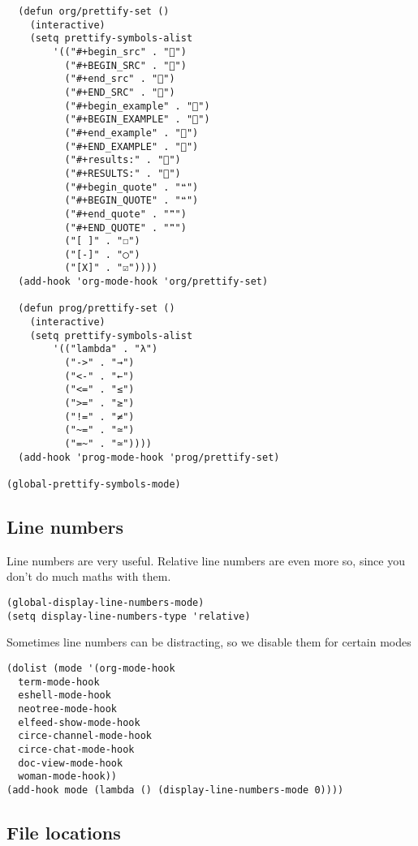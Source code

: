 \documentclass[11pt]{article}
\begin{document}
\begin{verbatim}
  (defun org/prettify-set ()
    (interactive)
    (setq prettify-symbols-alist
        '(("#+begin_src" . "")
          ("#+BEGIN_SRC" . "")
          ("#+end_src" . "")
          ("#+END_SRC" . "")
          ("#+begin_example" . "")
          ("#+BEGIN_EXAMPLE" . "")
          ("#+end_example" . "")
          ("#+END_EXAMPLE" . "")
          ("#+results:" . "")
          ("#+RESULTS:" . "")
          ("#+begin_quote" . "❝")
          ("#+BEGIN_QUOTE" . "❝")
          ("#+end_quote" . "❞")
          ("#+END_QUOTE" . "❞")
          ("[ ]" . "☐")
          ("[-]" . "◯")
          ("[X]" . "☑"))))
  (add-hook 'org-mode-hook 'org/prettify-set)

  (defun prog/prettify-set ()
    (interactive)
    (setq prettify-symbols-alist
        '(("lambda" . "λ")
          ("->" . "→")
          ("<-" . "←")
          ("<=" . "≤")
          (">=" . "≥")
          ("!=" . "≠")
          ("~=" . "≃")
          ("=~" . "≃"))))
  (add-hook 'prog-mode-hook 'prog/prettify-set)

(global-prettify-symbols-mode)

\end{verbatim}

\subsection*{Line numbers}
\label{sec:orgc486b6f}

Line numbers are very useful. Relative line numbers are even more so, since you don't do much maths with them.

\begin{verbatim}
(global-display-line-numbers-mode)
(setq display-line-numbers-type 'relative)
\end{verbatim}

Sometimes line numbers can be distracting, so we disable them for certain modes

\begin{verbatim}
(dolist (mode '(org-mode-hook
  term-mode-hook
  eshell-mode-hook
  neotree-mode-hook
  elfeed-show-mode-hook
  circe-channel-mode-hook
  circe-chat-mode-hook
  doc-view-mode-hook
  woman-mode-hook))
(add-hook mode (lambda () (display-line-numbers-mode 0))))
\end{verbatim}

\subsection*{File locations}
\label{sec:org48ad93a}
\end{document}
